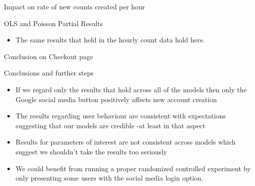 \documentclass{beamer}
\begin{document}
			\begin{frame}{Impact on rate of new counts created per hour}
				\begin{block}{OLS and Poisson Partial Results}
					\begin{itemize}
						\item The same results that held in the hourly count data hold here. 
					\end{itemize}
				\end{block}
			\end{frame}
			
			\begin{frame}{Conclusion on Checkout page}
				\begin{block}{Conclusions and further steps}
					\begin{itemize}
						\item If we regard only the results that hold across all of the models then only the Google social media button positively affects new account creation
						\item The results regarding user behaviour are consistent with expectations suggesting that our models are credible -at least in that aspect
						\item Results for parameters of interest are not consistent across models which suggest we shouldn't take the results too seriously
						\item We could benefit from running a proper randomized controlled experiment by only presenting some users with the social media login option.
					\end{itemize}
				\end{block}
			\end{frame}			
\end{document}
